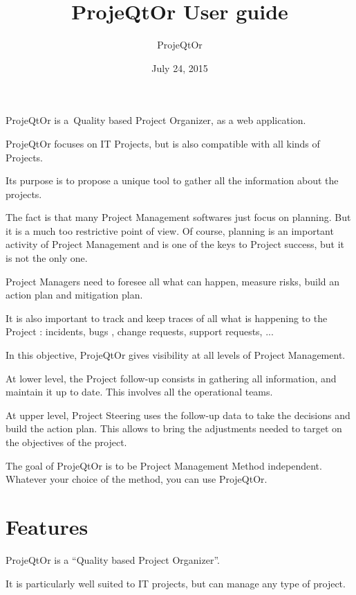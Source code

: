 \documentclass[letterpaper,10pt,english]{sphinxmanual}
\title{ProjeQtOr User guide}
\date{July 24, 2015}
\author{ProjeQtOr}
\begin{document}
\maketitle
\tableofcontents
{}\label{index::doc}


ProjeQtOr is a Quality based Project Organizer, as a web application.

ProjeQtOr focuses on IT Projects, but is also compatible with all kinds of Projects.

Its purpose is to propose a unique tool to gather all the information about the projects.

The fact is that many Project Management softwares just focus on planning.
But it is a much too restrictive point of view.
Of course, planning is an important activity of Project Management and is one of the keys to Project success,
but it is not the only one.

Project Managers need to foresee all what can happen, measure risks, build an action plan and mitigation plan.

It is also important to track and keep traces of all what is happening to the Project :
incidents, bugs , change requests, support requests, ...

In this objective, ProjeQtOr gives visibility at all levels of Project Management.

At lower level, the Project follow-up consists in gathering all information, and maintain it up to date.
This involves all the operational teams.

At upper level, Project Steering uses the follow-up data to take the decisions and build the action plan.
This allows to bring the adjustments needed to target on the objectives of the project.

The goal of ProjeQtOr is to be Project Management Method independent.
Whatever your choice of the method, you can use ProjeQtOr.


\chapter{Features}
\label{index:welcome}\label{index:features}
ProjeQtOr  is a ``Quality based Project Organizer''.

It is particularly well suited to IT projects, but can manage any type of project.
\end{document}
